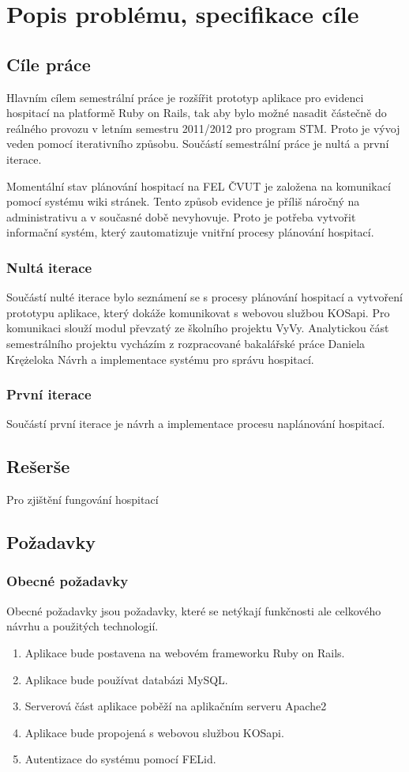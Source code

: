 \chapter{Popis problému, specifikace cíle}
\section{Cíle práce}
Hlavním cílem semestrální práce je rozšířit prototyp aplikace pro evidenci hospitací na platformě Ruby on Rails, tak aby bylo možné nasadit částečně do reálného provozu v letním semestru 2011/2012 pro program STM. Proto je vývoj veden pomocí iterativního způsobu. Součástí semestrální práce je nultá a první iterace.

Momentální stav plánování hospitací na FEL ČVUT je založena na komunikací pomocí systému wiki stránek. Tento způsob evidence je příliš náročný na administrativu a v současné době nevyhovuje. Proto je potřeba vytvořit informační systém, který zautomatizuje vnitřní procesy plánování hospitací. 

\subsection{Nultá iterace}
Součástí nulté iterace bylo seznámení se s procesy plánování hospitací a vytvoření prototypu aplikace, který dokáže komunikovat s webovou službou KOSapi. Pro komunikaci slouží modul převzatý ze školního projektu VyVy. 
Analytickou část semestrálního projektu vycházím z rozpracované bakalářské práce Daniela Krężeloka Návrh a implementace systému pro správu hospitací.
 
\subsection{První iterace}
Součástí první iterace je návrh a implementace procesu naplánování hospitací. 

\section{Rešerše}
Pro zjištění fungování hospitací 

\section{Požadavky}
\subsection{Obecné požadavky}
Obecné požadavky jsou požadavky, které se netýkají funkčnosti ale celkového návrhu a použitých technologií.
\begin{enumerate}
\item Aplikace bude postavena na webovém frameworku Ruby on Rails.
\item Aplikace bude používat databázi MySQL.
\item Serverová část aplikace poběží na aplikačním serveru Apache2
\item Aplikace bude propojená s webovou službou KOSapi.
\item Autentizace do systému pomocí FELid.
\end{enumerate}

